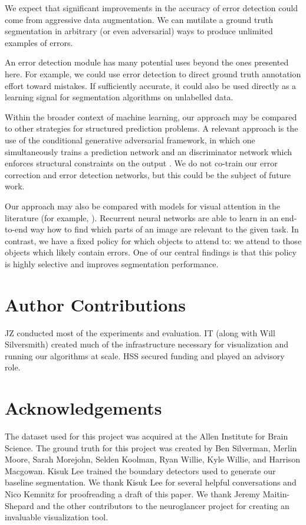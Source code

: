 \documentclass{article}
\begin{document}
We expect that significant improvements in the accuracy of error detection could come from aggressive data augmentation. We can mutilate a ground truth segmentation in arbitrary (or even adversarial) ways to produce unlimited examples of errors.

An error detection module has many potential uses beyond the ones presented here. For example, we could use error detection to direct ground truth annotation effort toward mistakes. If sufficiently accurate, it could also be used directly as a learning signal for segmentation algorithms on unlabelled data.

Within the broader context of machine learning, our approach may be compared to other strategies for structured prediction problems. A relevant approach is the use of the conditional generative adversarial framework, in which one simultaneously trains a prediction network and an discriminator network which enforces structural constraints on the output \cite{cgan1,cgan2}. We do not co-train our error correction and error detection networks, but this could be the subject of future work.

Our approach may also be compared with models for visual attention in the literature (for example, \cite{recurrent_attention}). Recurrent neural networks are able to learn in an end-to-end way how to find which parts of an image are relevant to the given task. In contrast, we have a fixed policy for which objects to attend to: we attend to those objects which likely contain errors. One of our central findings is that this policy is highly selective and improves segmentation performance.

\section{Author Contributions}
JZ conducted most of the experiments and evaluation. IT (along with
Will Silversmith) created much of the infrastructure necessary for visualization and running
our algorithms at scale. HSS secured funding and played an advisory role.

\section{Acknowledgements}
The dataset used for this project was acquired at the Allen Institute for Brain Science.
The ground truth for this project was created by Ben Silverman, Merlin Moore, Sarah Morejohn,
Selden Koolman, Ryan Willie, Kyle Willie, and Harrison Macgowan. Kisuk Lee trained the boundary
detectors used to generate our baseline segmentation. We thank Kisuk Lee for several
helpful conversations and Nico Kemnitz for proofreading a draft of this paper. We thank
Jeremy Maitin-Shepard and the other contributors to the neuroglancer project for creating an
invaluable visualization tool.
\end{document}
